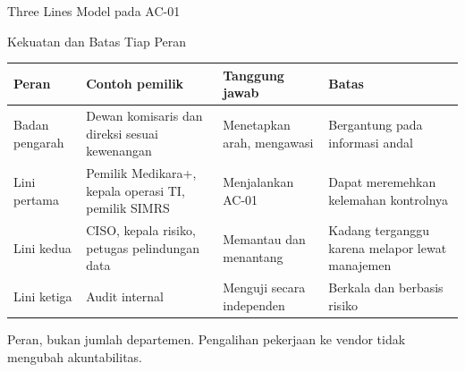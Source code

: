 \documentclass[aspectratio=169, table, 12pt]{beamer}
\begin{document}
\begin{frame}{{\Large Three Lines Model pada AC-01}}
  \vspace{2pt}
  \begin{center}
    \resizebox{0.86\textwidth}{!}{}
  \end{center}
\end{frame}

\begin{frame}{{\Large Kekuatan dan Batas Tiap Peran}}
  \vspace{4pt}
  \scriptsize
  \begin{tabularx}{\textwidth}{|>{\raggedright\arraybackslash}p{}|>{\raggedright\arraybackslash}p{}|>{\raggedright\arraybackslash}X|>{\raggedright\arraybackslash}X|}
    \hline
    \textbf{Peran} & \textbf{Contoh pemilik} & \textbf{Tanggung jawab} & \textbf{Batas} \\ \hline
    Badan pengarah & Dewan komisaris dan direksi sesuai kewenangan & Menetapkan arah, mengawasi &
    Bergantung pada informasi andal \\ \hline
    Lini pertama & Pemilik Medikara+, kepala operasi TI, pemilik SIMRS & Menjalankan AC-01 & Dapat
    meremehkan kelemahan kontrolnya \\ \hline
    Lini kedua & CISO, kepala risiko, petugas pelindungan data & Memantau dan menantang & Kadang
    terganggu karena melapor lewat manajemen \\ \hline
    Lini ketiga & Audit internal & Menguji secara independen & Berkala dan berbasis risiko \\ \hline
  \end{tabularx}

  \vspace{8pt}
  \small Peran, bukan jumlah departemen. Pengalihan pekerjaan ke vendor tidak mengubah
  akuntabilitas.
\end{frame}
\end{document}

